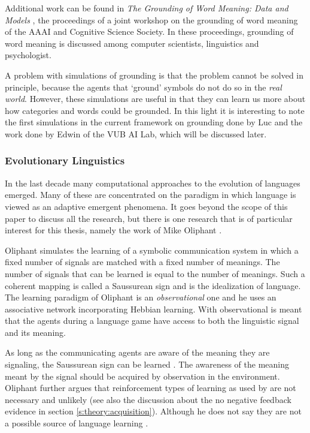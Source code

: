 Additional work can be found in {\em The Grounding of Word Meaning: Data and Models} \cite{gasser:1998}, the proceedings of a joint workshop on the grounding of word meaning of the AAAI and Cognitive Science Society. In these proceedings, grounding of word meaning is discussed among computer scientists, linguistics and psychologist. 

\p
A problem with simulations of grounding is that the problem cannot be solved in principle, because the agents that `ground' symbols do not do so in the {\em real world}. However, these simulations are useful in that they can learn us more about how categories and words could be grounded. In this light it is interesting to note the first simulations in the current framework on grounding done by Luc  and the work done by Edwin  of the VUB AI Lab, which will be discussed later.

\subsubsection{Evolutionary Linguistics}

In the last decade many computational approaches to the evolution of languages emerged. Many of these are concentrated on the paradigm in which language is viewed as an adaptive emergent phenomena. It goes beyond the scope of this paper to discuss all the research, but there is one research that is of particular interest for this thesis, namely the work of Mike Oliphant \cite{oliphant:1997,oliphant:1998,oliphant:2000}.

Oliphant simulates the learning of a symbolic communication system in which a fixed number of signals are matched with a fixed number of meanings. The number of signals that can be learned is equal to the number of meanings. Such a coherent mapping is called a Saussurean sign \cite{saussure:1959} and is the idealization of language. The learning paradigm of Oliphant is an {\em observational} one and he uses an associative network incorporating Hebbian learning. With observational is meant that the agents during a language game have access to both the linguistic signal and its meaning.

As long as the communicating agents are aware of the meaning they are signaling, the Saussurean sign can be learned \cite{oliphant:1997,oliphant:2000}. The awareness of the meaning meant by the signal should be acquired by observation in the environment. Oliphant further argues that reinforcement types of learning as used by \cite{yancostein,steels:1996a} are not necessary and unlikely (see also the discussion about the no negative feedback evidence in section \ref{s:theory:acquisition}). Although he does not say they are not a possible source of language learning \cite{oliphant:2000}.

